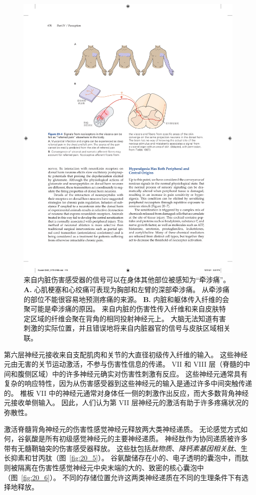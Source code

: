 \begin{figure}[htbp]
	\centering
	\includegraphics[width=0.9\linewidth]{chap20/fig_20_4}
	\caption{来自内脏伤害感受器的信号可以在身体其他部位被感知为“牵涉痛”。
		\textbf{A.} 心肌梗塞和心绞痛可表现为胸部和左臂的深部牵涉痛。
		从牵涉痛的部位不能很容易地预测疼痛的来源。
		\textbf{B.} 内脏和躯体传入纤维的会聚可能是牵涉痛的原因。
		来自内脏的伤害性传入纤维和来自皮肤特定区域的纤维会聚在背角的相同投射神经元上。
		大脑无法知道有害刺激的实际位置，并且错误地将来自内脏器官的信号与皮肤区域相关联\cite{fields1987painful}。}
	\label{fig:20_4}
\end{figure}


第六层神经元接收来自支配肌肉和关节的大直径初级传入纤维的输入。
这些神经元由无害的关节运动激活，不参与伤害性信息的传递。
VII 和 VIII 层（脊髓的中间和腹侧区域）中的许多神经元确实对伤害性刺激有反应。
这些神经元通常具有复杂的响应特性，因为从伤害感受器到这些神经元的输入是通过许多中间突触传递的。
椎板 VII 中的神经元通常对身体任一侧的刺激作出反应，而大多数背角神经元接收单侧输入。
因此，人们认为第 VII 层神经元的激活有助于许多疼痛状况的弥散性。


激活脊髓背角神经元的伤害性感觉神经元释放两大类神经递质。
无论感觉方式如何，谷氨酸是所有初级感觉神经元的主要神经递质。
神经肽作为协同递质被许多带有无髓鞘轴突的伤害感受器释放。
这些肽包括\textit{肽物质}、\textit{降钙素基因相关肽}、生长抑素和甘丙肽（图~\ref{fig:20_5}）。
谷氨酸储存在小的、电子透明的囊泡中，而肽则被隔离在伤害性感觉神经元中央末端的大的、致密的核心囊泡中（图~\ref{fig:20_6}）。
不同的存储位置允许这两类神经递质在不同的生理条件下有选择地释放。


